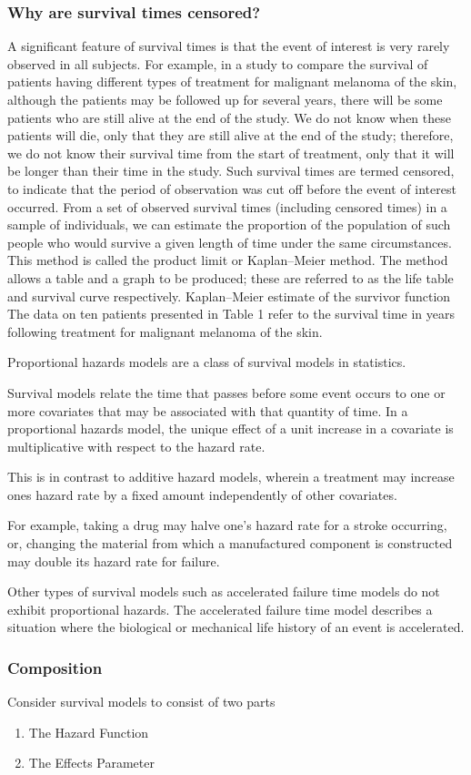 \subsubsection{Why are survival times
censored?}
A significant feature of survival times is that
the event of interest is very rarely observed in
all subjects. For example, in a study to
compare the survival of patients having
different types of treatment for malignant
melanoma of the skin, although the patients
may be followed up for several years, there
will be some patients who are still alive at the
end of the study. We do not know when these
patients will die, only that they are still alive
at the end of the study; therefore, we do not
know their survival time from the start of
treatment, only that it will be longer than
their time in the study. Such survival times
are termed censored, to indicate that the
period of observation was cut off before the
event of interest occurred.
From a set of observed survival times
(including censored times) in a sample of
individuals, we can estimate the proportion of
the population of such people who would survive a given length of time under the same
circumstances. This method is called the product limit or Kaplan–Meier method.
The method allows a table and a graph to be produced; these are referred to as the life table
and survival curve respectively.
Kaplan–Meier estimate of the survivor function The data on ten patients presented in Table 1
refer to the survival time in years following treatment for malignant melanoma of the
skin.


Proportional hazards models are a class of survival models in statistics. 


Survival models relate the time that passes before some event occurs to one or more covariates that may be associated with 
that quantity of time. In a proportional hazards model, the unique effect of a unit increase in a covariate is multiplicative 
with respect to the hazard rate. 

This is in contrast to additive hazard models, wherein a treatment may increase ones hazard rate by a fixed amount independently of other
covariates.

For example, taking a drug may halve one's hazard rate for a stroke occurring, or, changing
the material from which a manufactured component is constructed may double its hazard rate for failure. 

Other types of survival models such as accelerated failure time models do not exhibit proportional hazards. 
The accelerated failure time model describes a situation where 
the biological or mechanical life history of an event is accelerated.

\subsubsection*{Composition}
Consider survival models to consist of two parts
\begin{enumerate}
\item The Hazard Function
\item The Effects Parameter
\end{enumerate}
